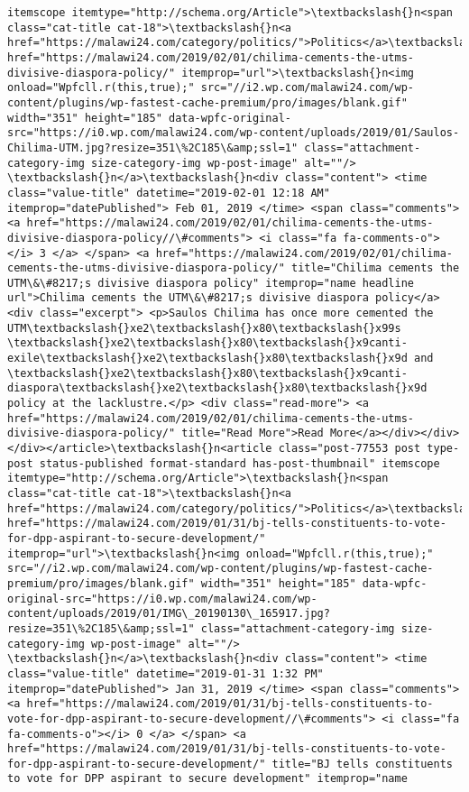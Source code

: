 \documentclass[11pt]{article}
\begin{document}
\begin{Verbatim}[commandchars=\\\{\}]
itemscope itemtype="http://schema.org/Article">\textbackslash{}n<span class="cat-title cat-18">\textbackslash{}n<a href="https://malawi24.com/category/politics/">Politics</a>\textbackslash{}n</span>\textbackslash{}n<a href="https://malawi24.com/2019/02/01/chilima-cements-the-utms-divisive-diaspora-policy/" itemprop="url">\textbackslash{}n<img onload="Wpfcll.r(this,true);" src="//i2.wp.com/malawi24.com/wp-content/plugins/wp-fastest-cache-premium/pro/images/blank.gif" width="351" height="185" data-wpfc-original-src="https://i0.wp.com/malawi24.com/wp-content/uploads/2019/01/Saulos-Chilima-UTM.jpg?resize=351\%2C185\&amp;ssl=1" class="attachment-category-img size-category-img wp-post-image" alt=""/>   \textbackslash{}n</a>\textbackslash{}n<div class="content"> <time class="value-title" datetime="2019-02-01 12:18 AM" itemprop="datePublished"> Feb 01, 2019 </time> <span class="comments"> <a href="https://malawi24.com/2019/02/01/chilima-cements-the-utms-divisive-diaspora-policy//\#comments"> <i class="fa fa-comments-o"></i> 3 </a> </span> <a href="https://malawi24.com/2019/02/01/chilima-cements-the-utms-divisive-diaspora-policy/" title="Chilima cements the UTM\&\#8217;s divisive diaspora policy" itemprop="name headline url">Chilima cements the UTM\&\#8217;s divisive diaspora policy</a> <div class="excerpt"> <p>Saulos Chilima has once more cemented the UTM\textbackslash{}xe2\textbackslash{}x80\textbackslash{}x99s \textbackslash{}xe2\textbackslash{}x80\textbackslash{}x9canti-exile\textbackslash{}xe2\textbackslash{}x80\textbackslash{}x9d and \textbackslash{}xe2\textbackslash{}x80\textbackslash{}x9canti-diaspora\textbackslash{}xe2\textbackslash{}x80\textbackslash{}x9d policy at the lacklustre.</p> <div class="read-more"> <a href="https://malawi24.com/2019/02/01/chilima-cements-the-utms-divisive-diaspora-policy/" title="Read More">Read More</a></div></div></div></article>\textbackslash{}n<article class="post-77553 post type-post status-published format-standard has-post-thumbnail" itemscope itemtype="http://schema.org/Article">\textbackslash{}n<span class="cat-title cat-18">\textbackslash{}n<a href="https://malawi24.com/category/politics/">Politics</a>\textbackslash{}n</span>\textbackslash{}n<a href="https://malawi24.com/2019/01/31/bj-tells-constituents-to-vote-for-dpp-aspirant-to-secure-development/" itemprop="url">\textbackslash{}n<img onload="Wpfcll.r(this,true);" src="//i2.wp.com/malawi24.com/wp-content/plugins/wp-fastest-cache-premium/pro/images/blank.gif" width="351" height="185" data-wpfc-original-src="https://i0.wp.com/malawi24.com/wp-content/uploads/2019/01/IMG\_20190130\_165917.jpg?resize=351\%2C185\&amp;ssl=1" class="attachment-category-img size-category-img wp-post-image" alt=""/>   \textbackslash{}n</a>\textbackslash{}n<div class="content"> <time class="value-title" datetime="2019-01-31 1:32 PM" itemprop="datePublished"> Jan 31, 2019 </time> <span class="comments"> <a href="https://malawi24.com/2019/01/31/bj-tells-constituents-to-vote-for-dpp-aspirant-to-secure-development//\#comments"> <i class="fa fa-comments-o"></i> 0 </a> </span> <a href="https://malawi24.com/2019/01/31/bj-tells-constituents-to-vote-for-dpp-aspirant-to-secure-development/" title="BJ tells constituents to vote for DPP aspirant to secure development" itemprop="name 
\end{Verbatim}
\end{document}
